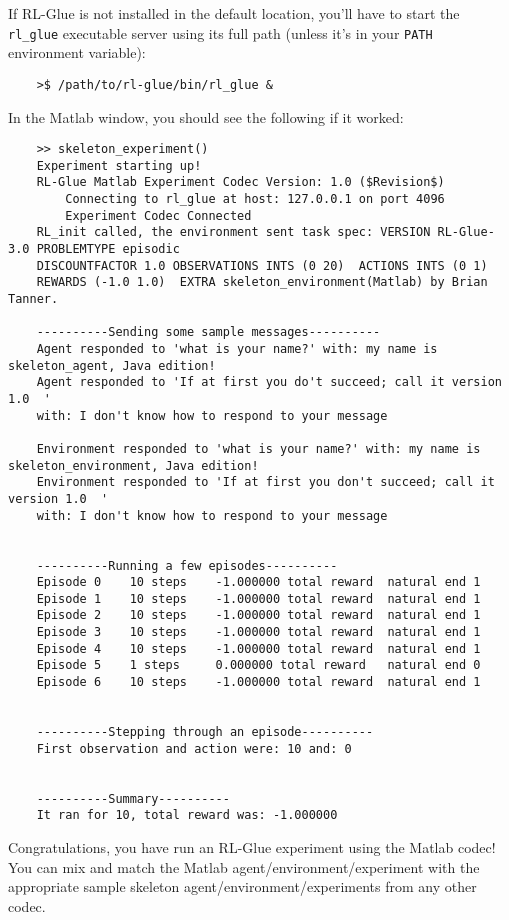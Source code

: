 \documentclass[11pt]{article}
\begin{document}
If RL-Glue is not installed in the default location, you'll have to start the \texttt{rl\_glue} executable server using its full path (unless it's in your \texttt{PATH} environment variable):
\begin{verbatim}
	>$ /path/to/rl-glue/bin/rl_glue &
\end{verbatim}

In the Matlab window, you should see the following if it worked:
\begin{verbatim}
	>> skeleton_experiment()
	Experiment starting up!
	RL-Glue Matlab Experiment Codec Version: 1.0 ($Revision$)
	    Connecting to rl_glue at host: 127.0.0.1 on port 4096
	    Experiment Codec Connected
	RL_init called, the environment sent task spec: VERSION RL-Glue-3.0 PROBLEMTYPE episodic 
	DISCOUNTFACTOR 1.0 OBSERVATIONS INTS (0 20)  ACTIONS INTS (0 1) 
	REWARDS (-1.0 1.0)  EXTRA skeleton_environment(Matlab) by Brian Tanner.

	----------Sending some sample messages----------
	Agent responded to 'what is your name?' with: my name is skeleton_agent, Java edition!
	Agent responded to 'If at first you do't succeed; call it version 1.0  ' 
	with: I don't know how to respond to your message

	Environment responded to 'what is your name?' with: my name is skeleton_environment, Java edition!
	Environment responded to 'If at first you don't succeed; call it version 1.0  ' 
	with: I don't know how to respond to your message


	----------Running a few episodes----------
	Episode 0	 10 steps 	 -1.000000 total reward	 natural end 1
	Episode 1	 10 steps 	 -1.000000 total reward	 natural end 1
	Episode 2	 10 steps 	 -1.000000 total reward	 natural end 1
	Episode 3	 10 steps 	 -1.000000 total reward	 natural end 1
	Episode 4	 10 steps 	 -1.000000 total reward	 natural end 1
	Episode 5	 1 steps 	 0.000000 total reward	 natural end 0
	Episode 6	 10 steps 	 -1.000000 total reward	 natural end 1


	----------Stepping through an episode----------
	First observation and action were: 10 and: 0


	----------Summary----------
	It ran for 10, total reward was: -1.000000
\end{verbatim}

Congratulations, you have run an RL-Glue experiment using the Matlab codec!  You can mix and match the Matlab agent/environment/experiment with the appropriate sample skeleton agent/environment/experiments from any other codec.
\end{document}
